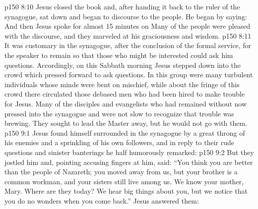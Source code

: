 \vs p150 8:10 Jesus closed the book and, after handing it back to the ruler of the synagogue, sat down and began to discourse to the people. He began by saying:  And then Jesus spoke for almost 15 minutes on  Many of the people were pleased with the discourse, and they marveled at his graciousness and wisdom.
\vs p150 8:11 It was customary in the synagogue, after the conclusion of the formal service, for the speaker to remain so that those who might be interested could ask him questions. Accordingly, on this Sabbath morning Jesus stepped down into the crowd which pressed forward to ask questions. In this group were many turbulent individuals whose minds were bent on mischief, while about the fringe of this crowd there circulated those debased men who had been hired to make trouble for Jesus. Many of the disciples and evangelists who had remained without now pressed into the synagogue and were not slow to recognize that trouble was brewing. They sought to lead the Master away, but he would not go with them.
\vs p150 9:1 Jesus found himself surrounded in the synagogue by a great throng of his enemies and a sprinkling of his own followers, and in reply to their rude questions and sinister banterings he half humorously remarked: 
\vs p150 9:2 But they jostled him and, pointing accusing fingers at him, said: “You think you are better than the people of Nazareth; you moved away from us, but your brother is a common workman, and your sisters still live among us. We know your mother, Mary. Where are they today? We hear big things about you, but we notice that you do no wonders when you come back.” Jesus answered them: 
